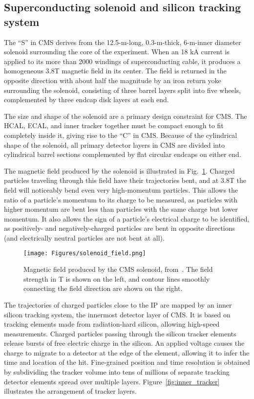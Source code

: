 \subsection{Superconducting solenoid and silicon tracking system} \label{sec:LHCCMS_CMS_magnet_tracker}
The ``S'' in CMS derives from the 12.5-m-long, 0.3-m-thick, 6-m-inner diameter solenoid surrounding the core of the experiment.
When an 18 kA current is applied to its more than 2000 windings of superconducting cable, it produces a homogeneous 3.8\unit{T} magnetic
field in its center. The field is returned in the opposite direction with about half the magnitude by an iron return yoke surrounding
the solenoid, consisting of three barrel layers split into five wheels, complemented by three endcap disk layers at each end.

The size and shape of the solenoid are a primary design constraint for CMS. The HCAL, ECAL, and inner tracker together must be compact
enough to fit completely inside it, giving rise to the ``C'' in CMS. Because of the cylindrical shape of the solenoid,
all primary detector layers in CMS are divided into cylindrical barrel sections complemented by flat circular endcaps on either end.

The magnetic field produced by the solenoid is illustrated in Fig.~\ref{fig:solenoid_field}.
Charged particles traveling through this field have their trajectories bent, and at 3.8\unit{T} the field will noticeably
bend even very high-momentum particles. This allows the ratio of a particle's momentum to its charge to be measured, as particles
with higher momentum are bent less than particles with the same charge but lower momentum. It also allows the sign of a particle's electrical charge
to be identified, as positively- and negatively-charged particles are bent in opposite directions (and electrically neutral
particles are not bent at all).

\begin{figure}[hbtp]
  \begin{center}
    \texttt{[image: Figures/solenoid\_field.png]}
    \caption{
    Magnetic field produced by the CMS solenoid, from~\cite{ref:1748-0221/5/03/T03021}. The field strength in T is shown on the left,
    and contour lines smoothly connecting the field direction are shown on the right.
    }
    \label{fig:solenoid_field}
  \end{center}
\end{figure}

The trajectories of charged particles close to the IP are mapped by an inner silicon tracking system, the innermost detector layer of CMS.
It is based on tracking elements made from radiation-hard silicon, allowing high-speed measurements.
Charged particles passing through the silicon tracker elements release bursts of free electric charge in the silicon. An applied voltage causes
the charge to migrate to a detector at the edge of the element, allowing it to infer the time and location of the hit.
Fine-grained position and time resolution is obtained by subdividing the tracker volume into tens of millions of separate tracking detector elements
spread over multiple layers. Figure~\ref{fig:inner_tracker} illustrates the arrangement of tracker layers.

